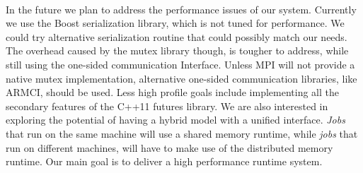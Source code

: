 \paragraph{}
In the future we plan to address the performance issues of our system.  Currently we use the Boost serialization
library, which is not tuned for performance.  We could try alternative serialization routine that could possibly
match our needs.  The overhead caused by the mutex library though, is tougher to address, while still using 
the one-sided communication Interface.  Unless MPI will not provide a native mutex implementation, alternative
one-sided communication libraries, like ARMCI, should be used.  Less high profile goals include implementing 
all the secondary features of the C++11 futures library.  We are also interested in exploring the potential of having 
a hybrid model with a unified interface. \emph{Jobs} that run on the same machine will use a shared memory runtime, 
while \emph{jobs} that run on different machines, will have to make use of the distributed memory runtime.  
Our main goal is to deliver a high performance runtime system.

